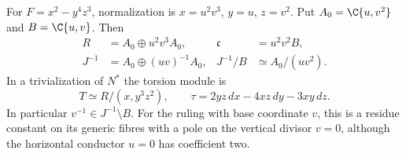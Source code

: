 
\begin{proposition}\label{cdp:st:A.2.5}
For $F=x^2-y^4z^3$, normalization is $x=u^2v^3$, $y=u$, $z=v^2$. Put $A_0=\C\{u,v^2\}$ and $B=\C\{u,v\}$. Then
\[
 \begin{aligned}
 R&=A_0\oplus u^2v^3A_0,&\mathfrak c&=u^2v^2B,\\
 J^{-1}&=A_0\oplus(uv)^{-1}A_0,&
 J^{-1}/B&\simeq A_0/(uv^2).
 \end{aligned}
 \tag{A.9a}\label{cdp:eq:A.9a}
\]
In a trivialization of $N^*$ the torsion module is
\[
 T\simeq R/(x,y^3z^2),\qquad
 \tau=2yz\,dx-4xz\,dy-3xy\,dz.
 \tag{A.9b}\label{cdp:eq:A.9b}
\]
In particular $v^{-1}\in J^{-1}\setminus B$. For the ruling with base coordinate $v$, this is a residue constant on its generic fibres with a pole on the vertical divisor $v=0$, although the horizontal conductor $u=0$ has coefficient two.
\end{proposition}
